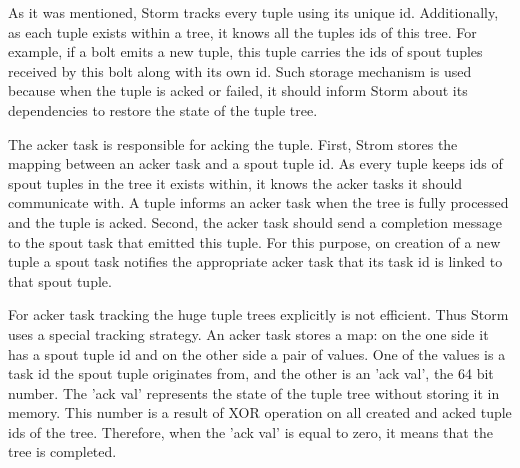 As it was mentioned, Storm tracks every tuple using its unique id.
Additionally, as each tuple exists within a tree, it knows all the tuples ids of this tree.
For example, if a bolt emits a new tuple, this tuple carries the ids of spout tuples received by this bolt along with its own id.
Such storage mechanism is used	because when the tuple is acked or failed, it should inform Storm about its dependencies to restore the state of the tuple tree.  

The acker task is responsible for acking the tuple.
First, Strom stores the mapping between an acker task and a spout tuple id.
As every tuple keeps ids of spout tuples in the tree it exists within, it knows the acker tasks it should communicate with.
A tuple informs an acker task when the tree is fully processed and the tuple is acked.
Second, the acker task should send a completion message to the spout task that emitted this tuple.
For this purpose, on creation of a new tuple a spout task notifies the appropriate acker task that its task id is linked to that spout tuple.

For acker task tracking the huge tuple trees explicitly is not efficient.
Thus Storm uses a special tracking strategy.
An acker task stores a map: on the one side it has a spout tuple id and on the other side a pair of values.
One of the values is a task id the spout tuple originates from, and the other is an 'ack val', the 64 bit number.
The 'ack val' represents the state of the tuple tree without storing it in memory.
This number is a result of XOR operation on all created and acked tuple ids of the tree.
Therefore, when the 'ack val' is equal to zero, it means that the tree is completed.  